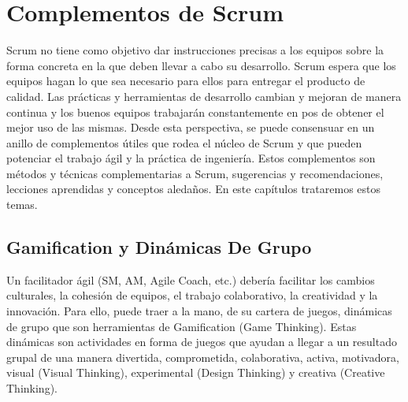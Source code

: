 \chapter{Complementos de Scrum}

Scrum no tiene como objetivo dar instrucciones precisas a los equipos sobre la forma concreta en la que deben llevar a cabo su desarrollo. Scrum espera que los equipos hagan lo que sea necesario para ellos para entregar el producto de calidad. Las prácticas y herramientas de desarrollo cambian y mejoran de manera continua y los buenos equipos trabajarán constantemente en pos de obtener el mejor uso de las mismas. Desde esta perspectiva, se puede consensuar en un anillo de complementos útiles que rodea el núcleo de Scrum y que pueden potenciar el trabajo ágil y la práctica de ingeniería. Estos complementos son métodos y técnicas complementarias a Scrum, sugerencias y recomendaciones, lecciones aprendidas y conceptos aledaños. En este capítulos trataremos estos temas.



\newpage
\section{Gamification y Dinámicas De Grupo}

Un facilitador ágil (SM, AM, Agile Coach, etc.) debería facilitar los cambios culturales, la cohesión de equipos, el trabajo colaborativo, la creatividad y la innovación. Para ello, puede traer a la mano, de su cartera de juegos, dinámicas de grupo que son herramientas de Gamification (Game Thinking). Estas dinámicas son actividades en forma de juegos que ayudan a llegar a un resultado grupal de una manera divertida, comprometida, colaborativa, activa, motivadora, visual (Visual Thinking), experimental (Design Thinking) y creativa (Creative Thinking).


